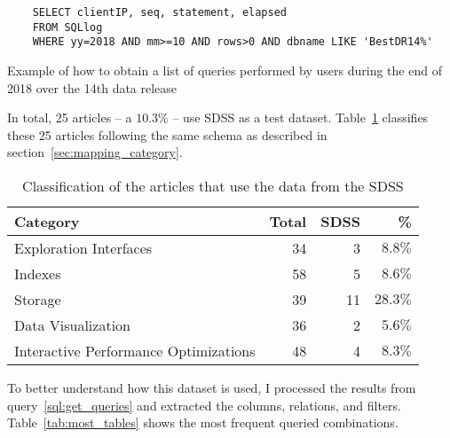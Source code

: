 \begin{listing}[htbp]
\begin{verbatim}
    SELECT clientIP, seq, statement, elapsed
    FROM SQLlog
    WHERE yy=2018 AND mm>=10 AND rows>0 AND dbname LIKE 'BestDR14%'
\end{verbatim}
\caption[Obtaining a list of queries performed by \gls{SDSS} users]{
    Example of how to obtain a list of queries performed by users during the end of 2018 over the 14th data release
}\label{sql:get_queries}
\end{listing}

In total, 25 articles -- a $10.3\%$ -- use \gls{SDSS} as a test dataset.
Table~\ref{tab:sdss_queries_count} classifies these 25 articles following the same schema as described
in section~\ref{sec:mapping_category}.

\begin{table}[htbp]
  \begin{center}
    \begin{tabular}{l r r r}
      \textbf{Category} & \textbf{Total} & \textbf{SDSS} & \textbf{\%} \\ \hline
      Exploration Interfaces & 34 & 3 & $8.8\%$ \\
      Indexes & 58 & 5 & $8.6\%$ \\
      Storage & 39 & 11 & $28.3\%$ \\
      Data Visualization & 36 & 2 & $5.6\%$ \\
      Interactive Performance Optimizations & 48 & 4 & $8.3\%$ \\
    \end{tabular}
  \end{center}
  \caption{Classification of the articles that use the data from the \gls{SDSS}}\label{tab:sdss_queries_count}
\end{table}

To better understand how this dataset is used, I processed the results from query~\ref{sql:get_queries}
and extracted the columns, relations, and filters.
Table~\ref{tab:most_tables} shows the most frequent queried combinations.

